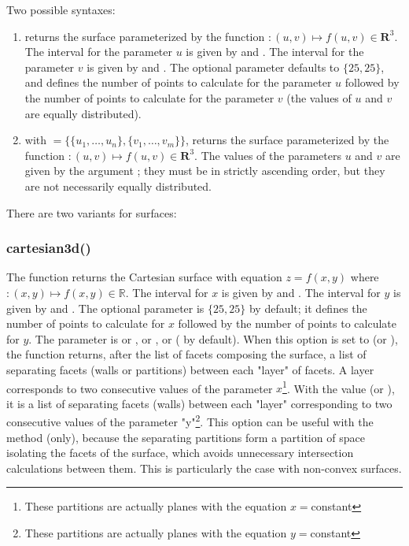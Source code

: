 Two possible syntaxes:
\begin{enumerate}
    \item {} returns the surface parameterized by the function $\colon(u,v) \mapsto f(u,v)\in \mathbf R^3$. The interval for the parameter $u$ is given by  and . The interval for the parameter $v$ is given by  and . The optional parameter  defaults to $\{25,25\}$, and defines the number of points to calculate for the parameter $u$ followed by the number of points to calculate for the parameter $v$ (the values ​​of $u$ and $v$ are equally distributed).

    \item {} with $=\{\{u_1,\ldots,u_n\}, \{v_1,\ldots,v_m\}\}$, returns the surface parameterized by the function $\colon(u,v) \mapsto f(u,v)\in \mathbf R^3$. The values ​​of the parameters $u$ and $v$ are given by the argument ; they must be in strictly ascending order, but they are not necessarily equally distributed.
\end{enumerate}

There are two variants for surfaces:

\subsubsection{cartesian3d()}

The function  returns the Cartesian surface with equation $z=f(x,y)$ where $\colon(x,y)\mapsto f(x,y)\in\mathbb R$. The interval for $x$ is given by  and . The interval for $y$ is given by  and . The optional parameter  is $\{25,25\}$ by default; it defines the number of points to calculate for $x$ followed by the number of points to calculate for $y$. The parameter  is  or , or , or  ( by default). When this option is set to  (or ), the function returns, after the list of facets composing the surface, a list of separating facets (walls or partitions) between each "layer" of facets. A layer corresponds to two consecutive values ​​of the parameter $x$\footnote{These partitions are actually planes with the equation $x=$constant}. With the value  (or ), it is a list of separating facets (walls) between each "layer" corresponding to two consecutive values ​​of the parameter "y"\footnote{These partitions are actually planes with the equation $y=$constant}. This option can be useful with the  method (only), because the separating partitions form a partition of space isolating the facets of the surface, which avoids unnecessary intersection calculations between them. This is particularly the case with non-convex surfaces.

